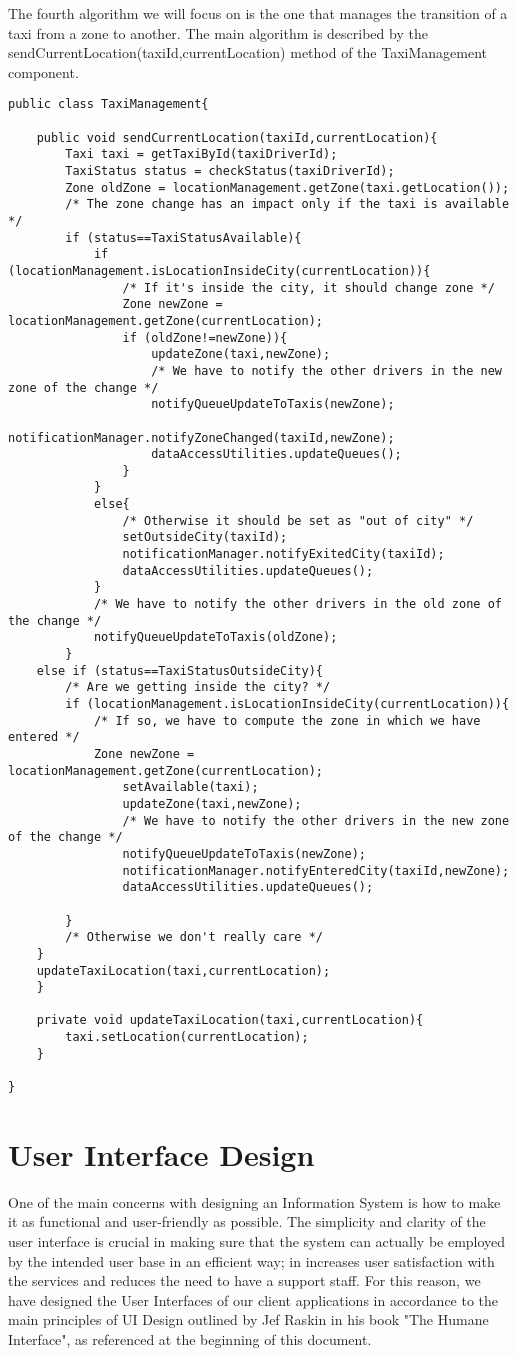 The fourth algorithm we will focus on is the one that manages the transition of a taxi from a zone to another. The main algorithm is described by the sendCurrentLocation(taxiId,currentLocation) method of the TaxiManagement component.

\begin{lstlisting}
public class TaxiManagement{
	
	public void sendCurrentLocation(taxiId,currentLocation){
		Taxi taxi = getTaxiById(taxiDriverId);
		TaxiStatus status = checkStatus(taxiDriverId);
		Zone oldZone = locationManagement.getZone(taxi.getLocation());
		/* The zone change has an impact only if the taxi is available */
		if (status==TaxiStatusAvailable){
			if (locationManagement.isLocationInsideCity(currentLocation)){
				/* If it's inside the city, it should change zone */
				Zone newZone = locationManagement.getZone(currentLocation);
				if (oldZone!=newZone)){
					updateZone(taxi,newZone);
					/* We have to notify the other drivers in the new zone of the change */
					notifyQueueUpdateToTaxis(newZone);
					notificationManager.notifyZoneChanged(taxiId,newZone);
					dataAccessUtilities.updateQueues();
				}
			}
			else{
				/* Otherwise it should be set as "out of city" */
				setOutsideCity(taxiId);
				notificationManager.notifyExitedCity(taxiId);
				dataAccessUtilities.updateQueues();
			}
			/* We have to notify the other drivers in the old zone of the change */
			notifyQueueUpdateToTaxis(oldZone);
		}
	else if (status==TaxiStatusOutsideCity){
		/* Are we getting inside the city? */
		if (locationManagement.isLocationInsideCity(currentLocation)){
			/* If so, we have to compute the zone in which we have entered */
			Zone newZone = locationManagement.getZone(currentLocation);
				setAvailable(taxi);
				updateZone(taxi,newZone);
				/* We have to notify the other drivers in the new zone of the change */
				notifyQueueUpdateToTaxis(newZone);
				notificationManager.notifyEnteredCity(taxiId,newZone);
				dataAccessUtilities.updateQueues();
				
		}
		/* Otherwise we don't really care */
	}
	updateTaxiLocation(taxi,currentLocation);
	}
	
	private void updateTaxiLocation(taxi,currentLocation){
		taxi.setLocation(currentLocation);
	}
	
}
\end{lstlisting}

\chapter{User Interface Design}
One of the main concerns with designing an Information System is how to make it as functional and user-friendly as possible. The simplicity and clarity of the user interface is crucial in making sure that the system can actually be employed by the intended user base in an efficient way; in increases user satisfaction with the services and reduces the need to have a support staff. 
For this reason, we have designed the User Interfaces of our client applications in accordance to the main principles of UI Design outlined by Jef Raskin in his book "The Humane Interface", as referenced at the beginning of this document. 

